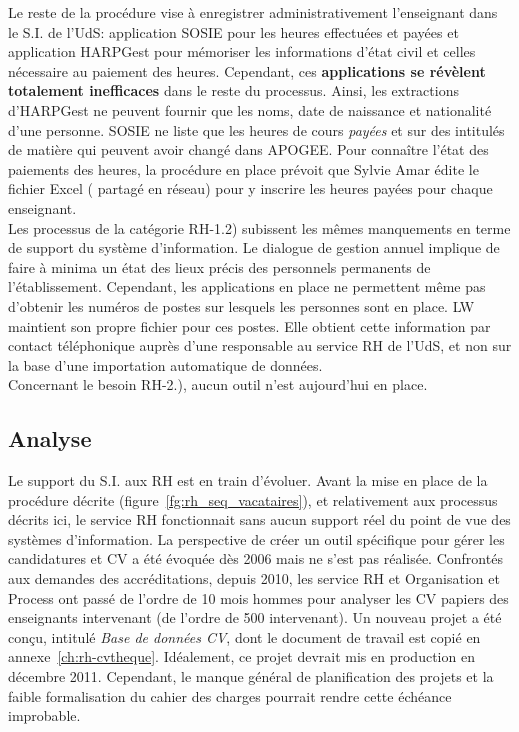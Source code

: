 \documentclass{book}
\begin{document}
Le reste de la procédure vise à enregistrer administrativement l'enseignant
dans le S.I. de l'UdS: application SOSIE pour les heures effectuées et payées
et application HARPGest pour mémoriser les informations d'état civil et celles
nécessaire au paiement des heures. 
Cependant, ces \textbf{applications se révèlent totalement inefficaces} dans 
le reste du processus. Ainsi, les extractions d'HARPGest ne peuvent fournir
que les noms, date de naissance et nationalité d'une personne. SOSIE ne liste
que les heures de cours \emph{payées} et sur des intitulés de matière qui
peuvent avoir changé dans APOGEE.
Pour connaître l'état des paiements des heures, la procédure en place prévoit
que Sylvie Amar édite le fichier Excel (\index{\clecommun} partagé en réseau) 
pour y inscrire les heures payées pour chaque enseignant.\\

Les processus de la catégorie RH-1.2) subissent les mêmes manquements en terme
de support du système d'information. Le dialogue de gestion annuel implique
de faire à minima un état des lieux précis des personnels permanents de 
l'établissement. Cependant, les applications en place ne permettent même pas
d'obtenir les numéros de postes sur lesquels les personnes sont en place.
LW maintient son propre fichier pour ces postes. Elle obtient cette information
par contact téléphonique auprès d'une responsable au service RH de l'UdS, et
non sur la base d'une importation automatique de données.\\

Concernant le besoin RH-2.), aucun outil n'est aujourd'hui en place.

\subsection{Analyse}
\label{sc:rh-analyse}
Le support du S.I. aux RH est en train d'évoluer. Avant la mise en place
de la procédure décrite (figure~\ref{fg:rh_seq_vacataires}), et relativement 
aux processus décrits ici, le service RH fonctionnait sans aucun support réel 
du point de vue des systèmes d'information. La perspective de créer un outil 
spécifique pour gérer les candidatures et CV a été évoquée dès 2006 mais ne 
s'est pas réalisée. 
Confrontés aux demandes des accréditations, depuis 2010, les service RH et
Organisation et Process ont passé de l'ordre de 10 mois hommes pour analyser 
les CV papiers des enseignants intervenant (de l'ordre de 500 intervenant). 
Un nouveau projet a été conçu, intitulé \textit{Base de données CV}, dont 
le document de travail est copié en annexe~\ref{ch:rh-cvtheque}.
Idéalement, ce projet devrait mis en production en décembre 2011. 
Cependant, le manque général de planification des projets et la faible 
formalisation du cahier des charges pourrait rendre cette échéance improbable.\\
\end{document}
